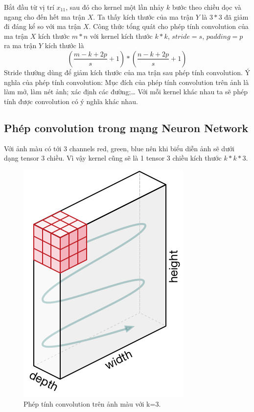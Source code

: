\begin{itemize}
Bắt đầu từ vị trí $x_{11}$, sau đó cho kernel một lần nhảy $k$ bước theo chiều dọc và ngang cho đến hết ma trận $X$. Ta thấy kích thước của ma trận $Y$ là $3*3$ đã giảm đi đáng kể so với ma trận $X$.
Công thức tổng quát cho phép tính convolution của ma trận $X$ kích thước $m*n$ với kernel kích thước $k*k$, $stride = s$, $padding = p$ ra ma trận $Y$ kích thước là $$(\frac{m-k+2p}{s}+1) * (\frac{n-k+2p}{s}+1)$$
Stride thường dùng để giảm kích thước của ma trận sau phép tính convolution.
Ý nghĩa của phép tính convolution:
Mục đích của phép tính convolution trên ảnh là làm mở, làm nét ảnh; xác định các đường;… Với mỗi kernel khác nhau ta sẽ phép tính được convolution có ý nghĩa khác nhau. 
\end{itemize} 
\subsection{Phép convolution trong mạng Neuron Network}
Với ảnh màu có tới 3 channels red, green, blue nên khi biểu diễn ảnh sẽ dưới dạng tensor 3 chiều. Vì vậy kernel cũng sẽ là 1 tensor 3 chiều kích thước $k*k*3$.

\FloatBarrier
\begin{figure}[htp]
\begin{center}
\includegraphics[scale=0.5]{chap2/c2_figs/13.png}
\end{center}
\caption{Phép tính convolution trên ảnh màu với k=3.}
\label{fig:padding,stride}
\end{figure}
\FloatBarrier

